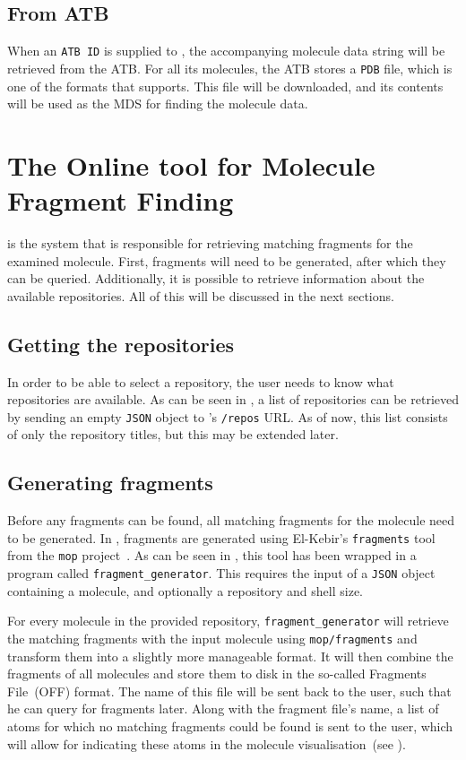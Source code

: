 \subsection{From ATB}
When an \verb|ATB ID| is supplied to \oapoc, the accompanying molecule data string will be retrieved from the ATB. For all its molecules, the ATB stores a \verb|PDB| file, which is one of the formats that \oapoc{} supports. This file will be downloaded, and its contents will be used as the MDS for finding the molecule data.



\section[\omfraf]{The Online tool for Molecule Fragment Finding}
\omfraf{} is the system that is responsible for retrieving matching fragments for the examined molecule. First, fragments will need to be generated, after which they can be queried. Additionally, it is possible to retrieve information about the available repositories. All of this will be discussed in the next sections.

\subsection{Getting the repositories}
In order to be able to select a repository, the user needs to know what repositories are available. As can be seen in , a list of repositories can be retrieved by sending an empty \verb|JSON| object to \omfraf's \verb|/repos| URL. As of now, this list consists of only the repository titles, but this may be extended later.

\subsection{Generating fragments}
Before any fragments can be found, all matching fragments for the molecule need to be generated. In \omfraf, fragments are generated using El-Kebir's \verb|fragments| tool from the \verb|mop| project~\cite{elkebir2014molecule}. As can be seen in , this tool has been wrapped in a program called \verb|fragment_generator|. This requires the input of a \verb|JSON| object containing a molecule, and optionally a repository and shell size.

For every molecule in the provided repository, \verb|fragment_generator| will retrieve the matching fragments with the input molecule using \verb|mop/fragments| and transform them into a slightly more manageable format. It will then combine the fragments of all molecules and store them to disk in the so-called \omfraf{} Fragments File~(OFF) format. The name of this file will be sent back to the \oframp{} user, such that he can query for fragments later. Along with the fragment file's name, a list of atoms for which no matching fragments could be found is sent to the user, which will allow for indicating these atoms in the molecule visualisation~(see ).


